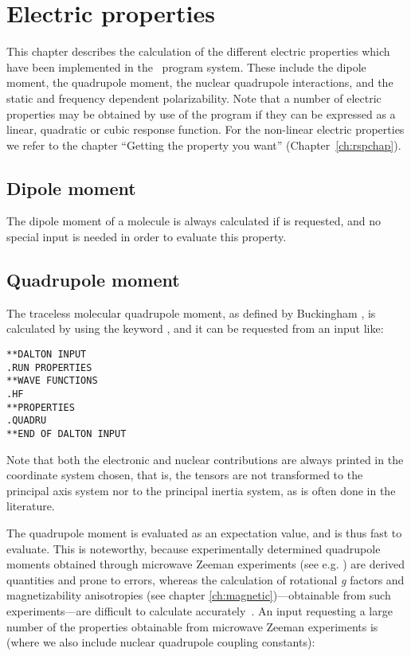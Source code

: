 \chapter{Electric properties}\label{ch:electric}

This chapter describes the calculation of the different electric
properties which have been implemented in the \siraba\ program system.
These include the dipole moment, the quadrupole
moment, the nuclear quadrupole
interactions, and the static and frequency dependent
polarizability. Note that a number of electric
properties may be
obtained by use of the {\resp} program if they can be expressed as a
linear, quadratic or cubic response function. For the non-linear
electric properties we refer to the chapter ``Getting the property you
want'' (Chapter~\ref{ch:rspchap}).

\section{Dipole moment}\label{sec:dipmom}

The dipole moment of a  molecule is always
calculated if  is
requested, and no special input is needed in order to evaluate this property.

\section{Quadrupole moment}\label{sec:quadmom}

The traceless molecular quadrupole moment, as
defined by Buckingham
\cite{adbacp12}, is calculated by using the keyword , and
it can be requested from an input like:

\begin{verbatim}
**DALTON INPUT
.RUN PROPERTIES
**WAVE FUNCTIONS
.HF
**PROPERTIES
.QUADRU
**END OF DALTON INPUT
\end{verbatim}

Note that both the electronic and nuclear contributions are always
printed in the coordinate system chosen, that is, the tensors are not
transformed to the principal axis system nor to the principal inertia
system, as is often done in the literature.

The quadrupole moment is evaluated as an expectation value, and is
thus fast to evaluate. This is noteworthy, because experimentally
determined quadrupole moments obtained through microwave Zeeman experiments
(see e.g.  \cite{whmklwhfjcp48,jsdhszna46}) are derived
quantities and prone to errors,
whereas the calculation of rotational {\em g} factors and magnetizability
anisotropies (see chapter
\ref{ch:magnetic})---obtainable from such
experiments---are difficult to calculate accurately~\cite{krthcpl264}. An input
requesting a large number of the properties obtainable from microwave
Zeeman experiments is (where we also include nuclear quadrupole
coupling constants):

